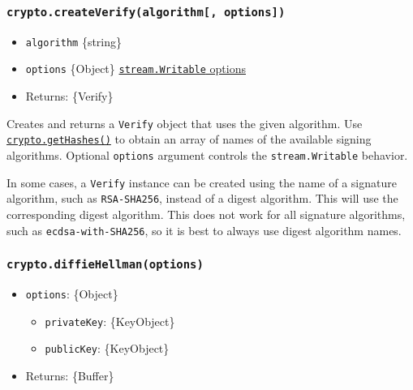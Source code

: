 \subsubsection{\texorpdfstring{\texttt{crypto.createVerify(algorithm{[},\ options{]})}}{crypto.createVerify(algorithm{[}, options{]})}}\label{crypto.createverifyalgorithm-options}

\begin{itemize}
\tightlist
\item
  \texttt{algorithm} \{string\}
\item
  \texttt{options} \{Object\}
  \href{stream.md\#new-streamwritableoptions}{\texttt{stream.Writable}
  options}
\item
  Returns: \{Verify\}
\end{itemize}

Creates and returns a \texttt{Verify} object that uses the given
algorithm. Use \hyperref[cryptogethashes]{\texttt{crypto.getHashes()}}
to obtain an array of names of the available signing algorithms.
Optional \texttt{options} argument controls the \texttt{stream.Writable}
behavior.

In some cases, a \texttt{Verify} instance can be created using the name
of a signature algorithm, such as
\texttt{\textquotesingle{}RSA-SHA256\textquotesingle{}}, instead of a
digest algorithm. This will use the corresponding digest algorithm. This
does not work for all signature algorithms, such as
\texttt{\textquotesingle{}ecdsa-with-SHA256\textquotesingle{}}, so it is
best to always use digest algorithm names.

\subsubsection{\texorpdfstring{\texttt{crypto.diffieHellman(options)}}{crypto.diffieHellman(options)}}\label{crypto.diffiehellmanoptions}

\begin{itemize}
\tightlist
\item
  \texttt{options}: \{Object\}

  \begin{itemize}
  \tightlist
  \item
    \texttt{privateKey}: \{KeyObject\}
  \item
    \texttt{publicKey}: \{KeyObject\}
  \end{itemize}
\item
  Returns: \{Buffer\}
\end{itemize}

